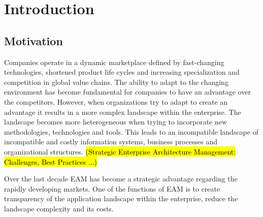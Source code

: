 
\chapter{Introduction}\label{chapter:introduction}


\section{Motivation}
Companies operate in a dynamic marketplace defined by fast-changing technologies, shortened product life cycles and increasing specialization and competition in global value chains. The ability to adapt to the changing environment has become fundamental for companies to have an advantage over the competitors. 
However, when organizations try to adapt to create an advantage it results in a more complex landscape within the enterprise. The landscape becomes more heterogeneous when trying to incorporate new methodologies, technologies and tools. This leads to an incompatible landscape of incompatible and costly information systems, business processes and organizational structures. \hl{(Strategic Enterprise Architecture Management: Challenges, Best Practices ...)}

Over the last decade EAM has become a strategic advantage regarding the rapidly developing markets. One of the functions of EAM is to create transparency of the application landscape within the enterprise, reduce the landscape complexity and its costs.

